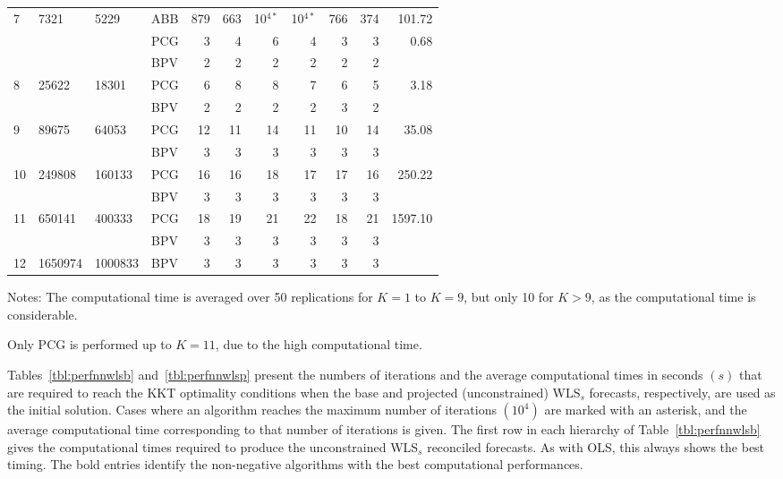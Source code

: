 \documentclass[11pt]{article}
\newcommand{\0}{\phantom{0}}
\begin{document}
\begin{table}[ht]
\begin{threeparttable}
\begin{tabular}{llllrrrrrrr}
			\midrule
			7 & 7321 & 5229 & ABB & 879 & 663 & 10$^{4*}$ & 10$^{4*}$ & 766 & 374 & 101.72 \\
			& & & PCG & 3 & 4 & 6 & 4 & 3 & 3 & 0.68 \\
			& & & BPV & 2 & 2 & 2 & 2 & 2 & 2 & \bm{$0.57$} \\
			\midrule
			8 & 25622 & 18301 & PCG & 6 & 8 & 8 & 7 & 6 & 5 & 3.18 \\
			& & & BPV & 2 & 2 & 2 & 2 & 3 & 2 & \bm{$1.76$} \\
			\midrule
			9 & 89675 & 64053 & PCG & 12 & 11 & 14 & 11 & 10 & 14 & 35.08 \\
			& & & BPV & 3 & 3 & 3 & 3 & 3 & 3 & \bm{$6.45$} \\
			\midrule
			10 & 249808 & 160133 & PCG & 16 & 16 & 18 & 17 & 17 & 16 & 250.22 \\
			& & & BPV & 3 & 3 & 3 & 3 & 3 & 3 & \bm{$21.00$} \\
			\midrule
			11 & 650141 & 400333 & PCG & 18 & 19 & 21 & 22 & 18 & 21 & 1597.10 \\
			& & & BPV & 3 & 3 & 3 & 3 & 3 & 3 & \bm{$56.84$} \\
			\midrule
			12 & 1650974 & 1000833 & BPV & 3 & 3 & 3 & 3 & 3 & 3 & \bm{$3247.09$}\\
			\bottomrule
		\end{tabular}
		\begin{tablenotes}
			\item [] Notes: The computational time is averaged over 50 replications for $K = 1$ to $K = 9$, but only 10 for $K > 9$, as the computational time is considerable.
			\item [] Only PCG is performed up to $K = 11$, due to the high computational time.
		\end{tablenotes}
	\end{threeparttable}
\end{table}


Tables~\ref{tbl:perfnnwlsb} and~\ref{tbl:perfnnwlsp} present the numbers of iterations and the average computational times in seconds $(s)$ that are required to reach the KKT optimality conditions when the base and projected (unconstrained) WLS$_{s}$ forecasts, respectively, are used as the initial solution. Cases where an algorithm reaches the maximum number of iterations $(10^{4})$ are marked with an asterisk, and the average computational time corresponding to that number of iterations is given. The first row in each hierarchy of Table~\ref{tbl:perfnnwlsb} gives the computational times required to produce the unconstrained WLS$_{s}$ reconciled forecasts. As with OLS, this always shows the best timing. The bold entries identify the non-negative algorithms with the best computational performances.
\end{document}
